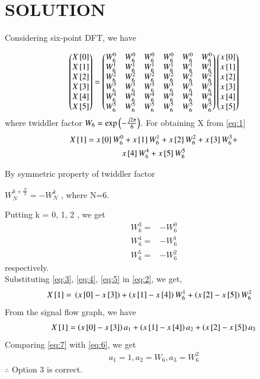 \documentclass[journal,12pt,twocolumn]{IEEEtran}
\begin{document}
\section*{SOLUTION}
Considering six-point DFT, we have 

\begin{align}
\label{eq:1}
\begin{pmatrix}X{}\left[0\right]\\X{}\left[1\right]\\X{}\left[2\right]\\X{}\left[3\right]\\X{}\left[4\right]\\X{}\left[5\right]\end{pmatrix} = \begin{pmatrix}W_{6}^{0}&W_{6}^{0}&W_{6}^{0}&W_{6}^{0}&W_{6}^{0}&W_{6}^{0}\\W_{6}^{1}&W_{6}^{1}&W_{6}^{1}&W_{6}^{1}&W_{6}^{1}&W_{6}^{1}\\W_{6}^{2}&W_{6}^{2}&W_{6}^{2}&W_{6}^{2}&W_{6}^{2}&W_{6}^{2}\\W_{6}^{3}&W_{6}^{3}&W_{6}^{3}&W_{6}^{3}&W_{6}^{3}&W_{6}^{3}\\W_{6}^{4}&W_{6}^{4}&W_{6}^{4}&W_{6}^{4}&W_{6}^{4}&W_{6}^{4}\\W_{6}^{5}&W_{6}^{5}&W_{6}^{5}&W_{6}^{5}&W_{6}^{5}&W_{6}^{5}\end{pmatrix}\begin{pmatrix}x{}\left[0\right]\\x{}\left[1\right]\\x{}\left[2\right]\\x{}\left[3\right]\\x{}\left[4\right]\\x{}\left[5\right]\end{pmatrix}
\end{align}
where twiddler factor $W_{6} = \text{exp}\left(-\frac{j2\pi}{6}\right)$.
For obtaining X from \eqref{eq:1}
\begin{multline}
X{}\left[1\right]= x{}\left[0\right]W_{6}^{0}+x{}\left[1\right]W_{6}^{1}+x{}\left[2\right]W_{6}^{2}+x{}\left[3\right]W_{6}^{3}+\\
x{}\left[4\right]W_{6}^{4}+x{}\left[5\right]W_{6}^{5}
\label{eq:2}
\end{multline}

By symmetric property of twiddler factor 
\begin{center}
$W_{N}^{k+\frac{N}{2}} = -W_{N}^{k}$ , where N=6.
\end{center}
Putting k = 0, 1, 2 , we get 
\begin{align}
\label{eq:3}
W_{6}^{3}={}&-W_{6}^{0}\\
\label{eq:4}
W_{6}^{4}={}&-W_{6}^{1}\\
\label{eq:5}
W_{6}^{5}={}&-W_{6}^{2}
\end{align}
respectively.\\
Substituting \eqref{eq:3}, \eqref{eq:4}, \eqref{eq:5} in \eqref{eq:2}, we get,
\begin{align}
X{}\left[1\right]={}&\left(x{}\left[0\right]-x{}\left[3\right]\right) + \left(x{}\left[1\right]-x{}\left[4\right]\right)W_{6}^{1} + \left(x{}\left[2\right]-x{}\left[5\right]\right)W_{6}^{2}
\label{eq:6}
\end{align}
From the signal flow graph, we have 
\begin{align}
\label{eq:7}
X{}\left[1\right]=\left(x{}\left[0\right]-x{}\left[3\right]\right)a_{1} + \left(x{}\left[1\right]-x{}\left[4\right]\right)a_{2} + \left(x{}\left[2\right]-x{}\left[5\right]\right)a_{3}
\end{align}
Comparing \eqref{eq:7} with \eqref{eq:6}, we get
\begin{align}
\label{eq:8} 
a_{1}=1, a_{2}=W_{6}, a_{3}=W_{6}^{2}
\end{align}
$\therefore$ Option 3 is correct.
\end{document}

